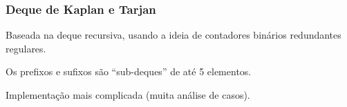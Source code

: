\documentclass[10pt, compress]{beamer}
\begin{document}
\begin{frame}[fragile]
	\frametitle{Deque de Kaplan e Tarjan}

	Baseada na deque recursiva, usando a ideia de contadores binários redundantes regulares.
	\vfill

	Os prefixos e sufixos são ``sub-deques'' de até 5 elementos.
	\vfill

	Implementação mais complicada (muita análise de casos).
	\vfill

	\begin{figure}
	\centering

	\end{figure}

\end{frame}
\end{document}
